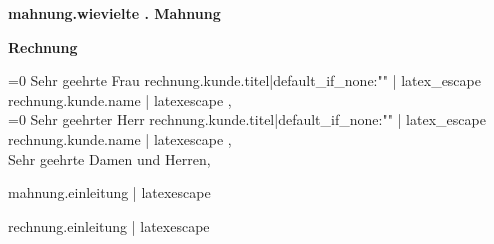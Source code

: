 \documentclass[a4paper,12pt,top=1.5cm,bottom=1.5cm]{article}
\begin{document}
    {%
        \large{\bf {{ mahnung.wievielte }}. Mahnung}\\[3ex]
    {%
        \large{\bf Rechnung}\\[3ex]
    {%

    \normalsize
    \ifnum{}=0
        Sehr geehrte Frau {{ rechnung.kunde.titel|default_if_none:"" | latex_escape }} {{ rechnung.kunde.name | latexescape }},\\[2ex]
    \else
        \ifnum{}=0
            Sehr geehrter Herr {{ rechnung.kunde.titel|default_if_none:"" | latex_escape }} {{ rechnung.kunde.name | latexescape }},\\[2ex]
        \else
            Sehr geehrte Damen und Herren,\\[2ex]
        \fi
    \fi

    {%
        {{ mahnung.einleitung | latexescape }} \ \\[3ex]
    {%
        {{ rechnung.einleitung | latexescape }} \ \\[3ex]
    {%

}}}}}}
\end{document}
